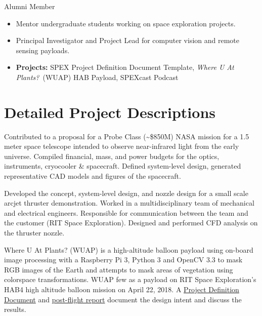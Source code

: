 \documentclass[10pt,final,sans]{resume}
\begin{document}
{
Alumni Member
\begin{itemize}
  \item Mentor undergraduate students working on space exploration projects.
  \item Principal Investigator and Project Lead for computer vision and remote sensing payloads.
  \item {\bf Projects:} SPEX Project Definition Document Template, {\it Where U At Plants?}~(WUAP) HAB Payload, SPEXcast Podcast
\end{itemize}


\break
\section{Detailed Project Descriptions}

Contributed to a proposal for a Probe Class (\textasciitilde\$850M) NASA mission for a 1.5 meter space telescope intended to observe near-infrared light from the early universe. Compiled financial, mass, and power budgets for the optics, instruments, cryocooler \& spacecraft. Defined system-level design, generated representative CAD models and figures of the spacecraft.

Developed the concept, system-level design, and nozzle design for a small scale arcjet thruster demonstration. Worked in a multidisciplinary team of mechanical and electrical engineers. Responsible for communication between the team and the customer (RIT Space Exploration). Designed and performed CFD analysis on the thruster nozzle.

Where U At Plants? (WUAP) is a high-altitude balloon payload using on-board image processing with a Raspberry Pi 3, Python 3 and OpenCV 3.3 to mask RGB images of the Earth and attempts to mask areas of vegetation using colorspace transformations. WUAP few as a payload on RIT Space Exploration's HAB4 high altitude balloon mission on April 22, 2018. A \href{https://github.com/RIT-Space-Exploration/hab-cv/blob/master/reports/Project%20Definition%20Document/hab-cv.pdf}{Project Definition Document} and \href{https://github.com/RIT-Space-Exploration/hab-cv/blob/master/reports/HAB4%20Post%20Flight%20Report/report_wuap_postflight-hab4.md}{post-flight report} document the design intent and discuss the results.

}
\end{document}

